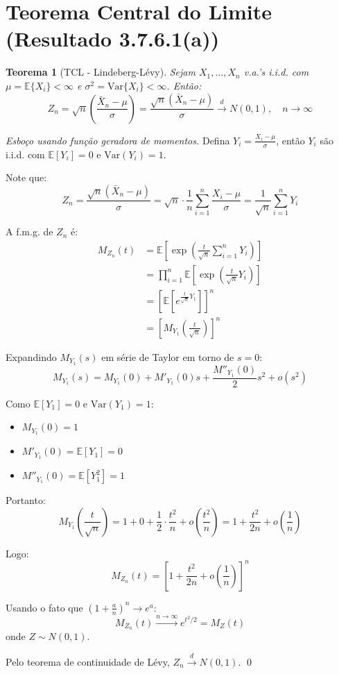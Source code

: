 \documentclass[12pt,a4paper]{article}
\theoremstyle{plain}
\newtheorem{teorema}{Teorema}[section]
\theoremstyle{definition}
\theoremstyle{remark}
\begin{document}
\section{Teorema Central do Limite (Resultado 3.7.6.1(a))}

\begin{teorema}[TCL - Lindeberg-Lévy]
Sejam $X_1, \ldots, X_n$ v.a.'s i.i.d. com $\mu = \mathbb{E}\{X_i\} < \infty$ e $\sigma^2 = \mathrm{Var}\{X_i\} < \infty$. Então:
\[
Z_n = \sqrt{n} \left( \frac{\bar{X}_n - \mu}{\sigma} \right) = \frac{\sqrt{n}(\bar{X}_n - \mu)}{\sigma} \xrightarrow{d} N(0,1), \quad n \to \infty
\]
\end{teorema}

\begin{proof}[Esboço usando função geradora de momentos]
Defina $Y_i = \frac{X_i - \mu}{\sigma}$, então $Y_i$ são i.i.d. com $\mathbb{E}[Y_i] = 0$ e $\mathrm{Var}(Y_i) = 1$.

Note que:
\[
Z_n = \frac{\sqrt{n}(\bar{X}_n - \mu)}{\sigma} = \sqrt{n} \cdot \frac{1}{n}\sum_{i=1}^n \frac{X_i - \mu}{\sigma} = \frac{1}{\sqrt{n}}\sum_{i=1}^n Y_i
\]

A f.m.g. de $Z_n$ é:
\begin{align}
M_{Z_n}(t) &= \mathbb{E}\left[\exp\left(\frac{t}{\sqrt{n}}\sum_{i=1}^n Y_i\right)\right] \\
&= \prod_{i=1}^n \mathbb{E}\left[\exp\left(\frac{t}{\sqrt{n}} Y_i\right)\right] \\
&= \left[\mathbb{E}\left[e^{\frac{t}{\sqrt{n}} Y_1}\right]\right]^n \\
&= \left[M_{Y_1}\left(\frac{t}{\sqrt{n}}\right)\right]^n
\end{align}

Expandindo $M_{Y_1}(s)$ em série de Taylor em torno de $s = 0$:
\[
M_{Y_1}(s) = M_{Y_1}(0) + M'_{Y_1}(0) s + \frac{M''_{Y_1}(0)}{2} s^2 + o(s^2)
\]

Como $\mathbb{E}[Y_1] = 0$ e $\mathrm{Var}(Y_1) = 1$:
\begin{itemize}
    \item $M_{Y_1}(0) = 1$
    \item $M'_{Y_1}(0) = \mathbb{E}[Y_1] = 0$
    \item $M''_{Y_1}(0) = \mathbb{E}[Y_1^2] = 1$
\end{itemize}

Portanto:
\[
M_{Y_1}\left(\frac{t}{\sqrt{n}}\right) = 1 + 0 + \frac{1}{2} \cdot \frac{t^2}{n} + o\left(\frac{t^2}{n}\right) = 1 + \frac{t^2}{2n} + o\left(\frac{1}{n}\right)
\]

Logo:
\[
M_{Z_n}(t) = \left[1 + \frac{t^2}{2n} + o\left(\frac{1}{n}\right)\right]^n
\]

Usando o fato que $\left(1 + \frac{a}{n}\right)^n \to e^a$:
\[
M_{Z_n}(t) \xrightarrow{n \to \infty} e^{t^2/2} = M_Z(t)
\]
onde $Z \sim N(0,1)$.

Pelo teorema de continuidade de Lévy, $Z_n \xrightarrow{d} N(0,1)$. \qed
\end{proof}
\end{document}

